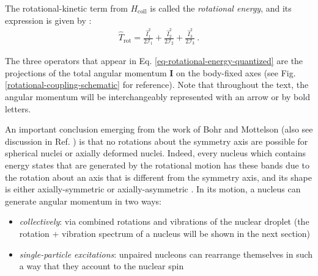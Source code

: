 The rotational-kinetic term from $H_\text{coll}$ is called the \emph{rotational energy}, and its expression is given by \cite{corrigan1976exact}:
\begin{align}
    \hat{T}_\text{rot}=\frac{\hat{I}_1^2}{2\mathcal{I}_1}+\frac{\hat{I}_2^2}{2\mathcal{I}_2}+\frac{\hat{I}_3^2}{2\mathcal{I}_3}\ .
    \label{eq-rotational-energy-quantized}
\end{align}

The three operators that appear in Eq. \eqref{eq-rotational-energy-quantized} are the projections of the total angular momentum $\mathbf{I}$ on the body-fixed axes (see Fig. \ref{rotational-coupling-schematic} for reference). Note that throughout the text, the angular momentum will be interchangeably represented with an arrow or by bold letters.

An important conclusion emerging from the work of Bohr and Mottelson \cite{bohr1954rotational} (also see discussion in Ref. \cite{greiner1996nuclear}) is that no rotations about the symmetry axis are possible for spherical nuclei or axially deformed nuclei. 
Indeed, every nucleus which contains energy states that are generated by the rotational motion has these bands due to the rotation about an axis that is different from the symmetry axis, and its shape is either axially-symmetric or axially-asymmetric \cite{hamamoto2016interplay}. In its motion, a nucleus can generate angular momentum in two ways:
\begin{itemize}
    \item \emph{collectively}: via combined rotations and vibrations of the nuclear droplet (the rotation + vibration spectrum of a nucleus will be shown in the next section)
    \item \emph{single-particle excitations}: unpaired nucleons can rearrange themselves in such a way that they account to the nuclear spin
\end{itemize}

